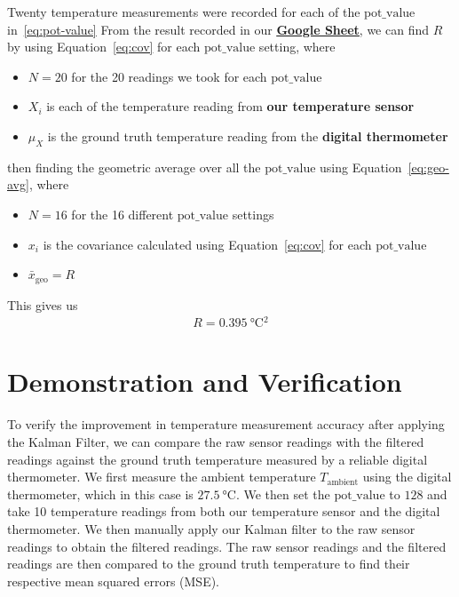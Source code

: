 \documentclass[12pt,a4paper]{article}
\begin{document}
Twenty temperature measurements were recorded for each of the $\text{pot\_value}$ in~\eqref{eq:pot-value}
From the result recorded in our \href{https://docs.google.com/spreadsheets/d/1mIqAQL7zom7rqrgY63SVOOFBYus10Tk0CKpmR08Oij0/edit?gid=501799072#gid=501799072}{\textbf{\underline{Google Sheet}}}, we can find $R$ by using Equation~\eqref{eq:cov} for each $\text{pot\_value}$ setting, where

\begin{itemize}
    \item $N=20$ for the 20 readings we took for each $\text{pot\_value}$
    \item $X_i$ is each of the temperature reading from \textbf{our temperature sensor}
    \item $\mu_X$ is the ground truth temperature reading from the \textbf{digital thermometer}
\end{itemize}
then finding the geometric average over all the $\text{pot\_value}$ using Equation~\eqref{eq:geo-avg}, where
\begin{itemize}
    \item $N=16$ for the 16 different $\text{pot\_value}$ settings
    \item $x_i$ is the covariance calculated using Equation~\eqref{eq:cov} for each $\text{pot\_value}$
    \item $\bar{x}_{\mathrm{geo}}=R$
\end{itemize}
This gives us
\begin{align*}
    R = \SI{0.395}{\degreeCelsius^2}
\end{align*}

\section{Demonstration and Verification}
To verify the improvement in temperature measurement accuracy after applying the Kalman Filter, we can compare the raw sensor readings with the filtered readings against the ground truth temperature measured by a reliable digital thermometer. We first measure the ambient temperature $T_{\text{ambient}}$ using the digital thermometer, which in this case is $\SI{27.5}{\degreeCelsius}$. We then set the $\text{pot\_value}$ to $128$ and take 10 temperature readings from both our temperature sensor and the digital thermometer. We then manually apply our Kalman filter to the raw sensor readings to obtain the filtered readings. The raw sensor readings and the filtered readings are then compared to the ground truth temperature to find their respective mean squared errors (MSE).
\end{document}
